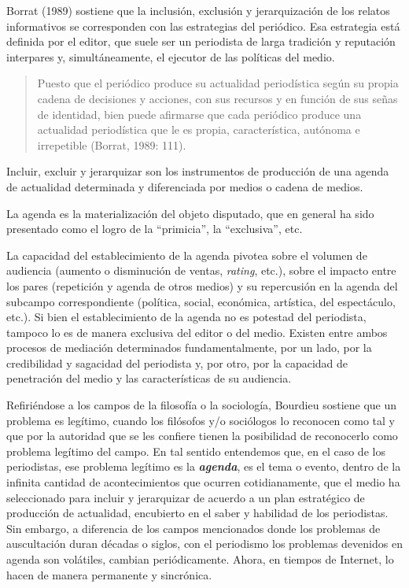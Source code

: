 Borrat (1989) sostiene que la inclusión, exclusión y jerarquización de los relatos informativos se corresponden con las estrategias del periódico. Esa estrategia está definida por el editor, que suele ser un periodista de larga tradición y reputación interpares y, simultáneamente, el ejecutor de las políticas del medio.

\begin{quote}
Puesto que el periódico produce su actualidad periodística según su propia cadena de decisiones y acciones, con sus recursos y en función de sus señas de identidad, bien puede afirmarse que cada periódico produce una actualidad periodística que le es propia, característica, autónoma e irrepetible (Borrat, 1989: 111).
\end{quote}

Incluir, excluir y jerarquizar son los instrumentos de producción de una agenda de actualidad determinada y diferenciada por medios o cadena de medios.

La agenda es la materialización del objeto disputado, que en general ha sido presentado como el logro de la ``primicia'', la ``exclusiva'', etc.

La capacidad del establecimiento de la agenda pivotea sobre el volumen de audiencia (aumento o disminución de ventas, \emph{rating}, etc.), sobre el impacto entre los pares (repetición y agenda de otros medios) y su repercusión en la agenda del subcampo correspondiente (política, social, económica, artística, del espectáculo, etc.). Si bien el establecimiento de la agenda no es potestad del periodista, tampoco lo es de manera exclusiva del editor o del medio. Existen entre ambos  procesos de mediación determinados fundamentalmente, por un lado, por la credibilidad y sagacidad del periodista y, por otro, por la capacidad de penetración del medio y las características de su audiencia.

Refiriéndose a los campos de la filosofía o la sociología, Bourdieu sostiene que un problema es legítimo, cuando los filósofos y/o sociólogos lo reconocen como tal y que por la autoridad que se les confiere tienen la posibilidad de reconocerlo como problema legítimo del campo. En tal sentido entendemos que, en el caso de los periodistas, ese problema legítimo es la \emph{\textbf{agenda}}, es el tema o evento, dentro de la infinita cantidad de acontecimientos que ocurren cotidianamente, que el medio ha seleccionado para incluir y jerarquizar de acuerdo a un plan estratégico de producción de actualidad, encubierto en el saber y habilidad de los periodistas. Sin embargo, a diferencia de los campos mencionados donde los problemas de auscultación duran décadas o siglos, con el periodismo  los problemas devenidos en agenda son volátiles, cambian periódicamente. Ahora, en tiempos de Internet, lo hacen de manera permanente y sincrónica.

